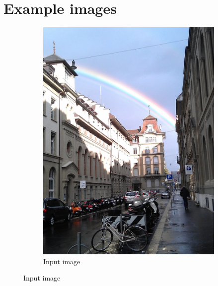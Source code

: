 \documentclass[a4paper]{article}
\begin{document}
\section*{Example images}
\begin{figure}[H]
	\begin{subfigure}[h]{0.24\textwidth}
		\centering
		\includegraphics[width=\textwidth]{rainbow}
		\caption*{Input image}
	\end{subfigure}
	

\end{figure}
\end{document}
